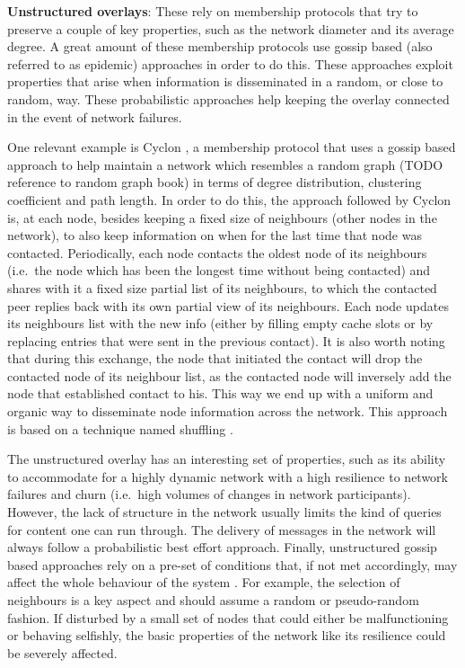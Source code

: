 \textbf{Unstructured overlays}: These rely on membership protocols that
try to preserve a couple of key properties, such as the network diameter
and its average degree. A great amount of these membership protocols use
gossip based (also referred to as epidemic) approaches in order to do
this. These approaches exploit properties that arise when information is
disseminated in a random, or close to random, way. These probabilistic
approaches help keeping the overlay connected in the event of network
failures.

One relevant example is Cyclon \cite{Voulgaris2005a}, a membership
protocol that uses a gossip based approach to help maintain a network
which resembles a random graph (TODO reference to random graph book) in
terms of degree distribution, clustering coefficient and path length. In
order to do this, the approach followed by Cyclon is, at each node,
besides keeping a fixed size of neighbours (other nodes in the network),
to also keep information on when for the last time that node was
contacted. Periodically, each node contacts the oldest node of its
neighbours (i.e.~the node which has been the longest time without being
contacted) and shares with it a fixed size partial list of its
neighbours, to which the contacted peer replies back with its own
partial view of its neighbours. Each node updates its neighbours list
with the new info (either by filling empty cache slots or by replacing
entries that were sent in the previous contact). It is also worth noting
that during this exchange, the node that initiated the contact will drop
the contacted node of its neighbour list, as the contacted node will
inversely add the node that established contact to his. This way we end
up with a uniform and organic way to disseminate node information across
the network. This approach is based on a technique named shuffling \cite{Stavrou2002}.

The unstructured overlay has an interesting set of properties, such as
its ability to accommodate for a highly dynamic network with a high
resilience to network failures and churn (i.e.~high volumes of changes
in network participants). However, the lack of structure in the network
usually limits the kind of queries for content one can run through. The
delivery of messages in the network will always follow a probabilistic
best effort approach. Finally, unstructured gossip based approaches rely
on a pre-set of conditions that, if not met accordingly, may affect the
whole behaviour of the system \cite{Alvisi2007}. For example, the selection of
neighbours is a key aspect and should assume a random or pseudo-random
fashion. If disturbed by a small set of nodes that could either be
malfunctioning or behaving selfishly, the basic properties of the
network like its resilience could be severely affected.
\bigskip

